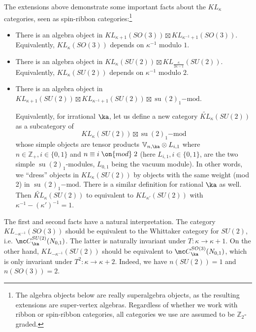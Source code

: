 \documentclass[11pt,reqno]{amsart}
\theoremstyle{plain}
\numberwithin{equation}{section}
\newcommand{\Z}{\mathbb{Z}}
\DeclareMathOperator{\tsu}{su}
\theoremstyle{definition}
\begin{document}
\medskip

The extensions above demonstrate some important facts about the
$KL_\kappa$ categories, seen as spin-ribbon categories:\footnote{The
  algebra objects below are really superalgebra objects, as the
  resulting extensions are super-vertex algebras. Regardless of
  whether we work with ribbon or spin-ribbon categories, all
  categories we use are assumed to be $\Z_2$-graded.}

\medskip

\begin{itemize}
\item There is an algebra object in $KL_{\kappa+1}(SO(3)) \boxtimes KL_{\kappa^{-1}+1}(SO(3))$. Equivalently, 
$KL_{\kappa}(SO(3))$ depends on $\kappa^{-1}$ modulo $1$. 

\medskip

\item There is an algebra object in $KL_{\kappa}(SU(2)) \boxtimes
  KL_{\frac{\kappa}{2 \kappa-1}}(SU(2))$. Equivalently, \linebreak
  $KL_{\kappa}(SU(2))$ depends on $\kappa^{-1}$ modulo $2$. 

\medskip

\item There is an algebra object in $KL_{\kappa+1}(SU(2)) \boxtimes
  KL_{\kappa^{-1}+1}(SU(2)) \boxtimes \tsu(2)_1\mathrm {-mod}$.

  Equivalently, for irrational $\ka$, let us define a new category
  $\widetilde{KL}_{\kappa}(SU(2))$ as a subcategory of
  $$KL_{\kappa}(SU(2)) \boxtimes \tsu(2)_1\mathrm {-mod}$$ whose simple
  objects are tensor products ${\mathbb V}_{n,\ka} \otimes L_{i,1}$
  where $n \in \Z_+, i \in \{ 0,1 \}$ and $n \equiv i \; \on{mod} \;
  2$ (here $L_{i,1}, i \in \{ 0,1 \}$, are the two simple
  $\tsu(2)_1$-modules, $L_{0,1}$ being the vacuum module). In other
  words, we ``dress'' objects in $KL_{\kappa}(SU(2))$ by objects with
  the same weight (mod 2) in $\tsu(2)_1\mathrm {-mod}$. There is a
  similar definition for rational $\ka$ as well. Then
  $\widetilde{KL}_{\kappa}(SU(2))$ to equivalent to
  $KL_{\kappa'}(SU(2))$ with $\kappa^{-1} - (\kappa')^{-1} =1$.
\end{itemize}

\medskip

The first and second facts have a natural interpretation. The category
$KL_{-\kappa^{-1}}(SO(3))$ should be equivalent to the Whittaker
category for $SU(2)$, i.e.  ${\mc C}^{SU(2)}_\ka(N_{0,1})$. The latter
is naturally invariant under $T: \kappa \to \kappa+1$.  On the other
hand, $KL_{-\kappa^{-1}}(SU(2))$ should be equivalent to ${\mc
  C}^{SO(3)}_\ka(N_{0,1})$, which is only invariant under $T^2: \kappa
\to \kappa+2$. Indeed, we have $n(SU(2))=1$ and $n(SO(3))=2$.
\end{document}
